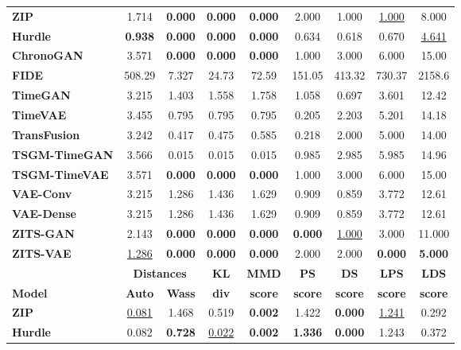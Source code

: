 \documentclass[make,article,submit,moreauthors]{Definitions/mdpi}
\begin{document}
\begin{table}[htbp]
\begin{tabular}{l cccccccc}
\midrule
\textbf{ZIP}          & 1.714 & \textbf{0.000} & \textbf{0.000} & \textbf{0.000} & 2.000 & 1.000 & \underline{1.000} & 8.000 \\
\textbf{Hurdle}       & \textbf{0.938} & \textbf{0.000} & \textbf{0.000} & \textbf{0.000} & 0.634 & 0.618 & 0.670 & \underline{4.641} \\
\textbf{ChronoGAN}    & 3.571 & \textbf{0.000} & \textbf{0.000} & \textbf{0.000} & 1.000 & 3.000 & 6.000 & 15.00 \\
\textbf{FIDE}         & 508.29 & 7.327 & 24.73 & 72.59 & 151.05 & 413.32 & 730.37 & 2158.6 \\
\textbf{TimeGAN}      & 3.215 & 1.403 & 1.558 & 1.758 & 1.058 & 0.697 & 3.601 & 12.42 \\
\textbf{TimeVAE}      & 3.455 & 0.795 & 0.795 & 0.795 & 0.205 & 2.203 & 5.201 & 14.18 \\
\textbf{TransFusion}  & 3.242 & 0.417 & 0.475 & 0.585 & 0.218 & 2.000 & 5.000 & 14.00 \\
\textbf{TSGM-TimeGAN} & 3.566 & 0.015 & 0.015 & 0.015 & 0.985 & 2.985 & 5.985 & 14.96 \\
\textbf{TSGM-TimeVAE} & 3.571 & \textbf{0.000} & \textbf{0.000} & \textbf{0.000} & 1.000 & 3.000 & 6.000 & 15.00 \\
\textbf{VAE-Conv}     & 3.215 & 1.286 & 1.436 & 1.629 & 0.909 & 0.859 & 3.772 & 12.61 \\
\textbf{VAE-Dense}    & 3.215 & 1.286 & 1.436 & 1.629 & 0.909 & 0.859 & 3.772 & 12.61 \\
\textbf{ZITS-GAN}     & 2.143 & \textbf{0.000} & \textbf{0.000} & \textbf{0.000} & \textbf{0.000} & \underline{1.000} & 3.000 & 11.000 \\
\textbf{ZITS-VAE}     & \underline{1.286} & \textbf{0.000} & \textbf{0.000} & \textbf{0.000} & 2.000 & 2.000 & \textbf{0.000} & \textbf{5.000} \\
\midrule
& \multicolumn{2}{c}{\textbf{Distances}} & \textbf{KL} & \textbf{MMD} & \textbf{PS} & \textbf{DS} & \textbf{LPS} & \textbf{LDS} \\
\cmidrule(lr){2-3}
\textbf{Model} & \textbf{Auto} & \textbf{Wass} & \textbf{div} & \textbf{score} & \textbf{score} & \textbf{score} & \textbf{score} & \textbf{score} \\
\midrule
\textbf{ZIP}          & \underline{0.081} & 1.468 & 0.519 & \textbf{0.002} & 1.422 & \textbf{0.000} & \underline{1.241} & 0.292 \\
\textbf{Hurdle}       & 0.082 & \textbf{0.728} & \underline{0.022} & \textbf{0.002} & \textbf{1.336} & \textbf{0.000} & 1.243 & 0.372 \\

\end{tabular}
\end{table}
\end{document}
